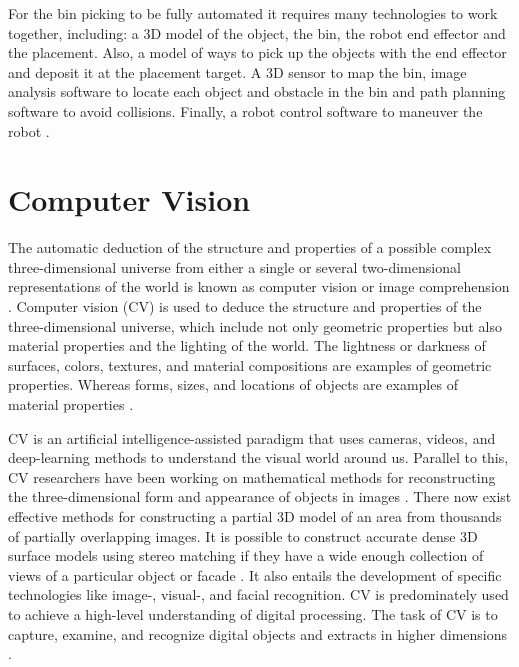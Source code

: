For the bin picking to be fully automated it requires many technologies to work together, including: a 3D model of the object, the bin, the robot end effector and the placement. Also, a model of ways to pick up the objects with the end effector and deposit it at the placement target. A 3D sensor to map the bin, image analysis software to locate each object and obstacle in the bin and path planning software to avoid collisions. Finally, a robot control software to maneuver the robot \cite{truebenbach_is_2019}.





\section{Computer Vision}
The automatic deduction of the structure and properties of a possible complex three-dimensional universe from either a single or several two-dimensional representations of the world is known as computer vision or image comprehension \cite{nalwa_what_1994}. 
Computer vision (CV) is used to deduce the structure and properties of the three-dimensional universe, which include not only geometric properties but also material properties and the lighting of the world. 
The lightness or darkness of surfaces, colors, textures, and material compositions are examples of geometric properties. Whereas forms, sizes, and locations of objects are examples of material properties \cite{szeliski_computer_2010}. %

CV is an artificial intelligence-assisted paradigm that uses cameras, videos, and deep-learning methods to understand the visual world around us. Parallel to this, CV researchers have been working on mathematical methods for reconstructing the three-dimensional form and appearance of objects in images \cite{guo_lossy_2018}. 
There now exist effective methods for constructing a partial 3D model of an area from thousands of partially overlapping images. It is possible to construct accurate dense 3D surface models using stereo matching if they have a wide enough collection of views of a particular object or facade \cite{liu_detection_2020}. 
It also entails the development of specific technologies like image-, visual-, and facial recognition. CV is predominately used to achieve a high-level understanding of digital processing. The task of CV is to capture, examine, and recognize digital objects and extracts in higher dimensions \cite{manogaran_wearable_2019}.

